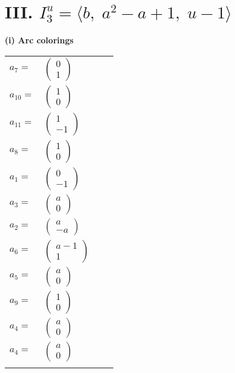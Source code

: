 \documentclass[1p]{elsarticle_modified}
\theoremstyle{definition}
\begin{document}
\centering \section*{III. $I^u_{3}= \langle b,\;a^2- a+1,\;u-1 \rangle$}
\flushleft \textbf{(i) Arc colorings}\\
\begin{tabular}{m{7pt} m{180pt} m{7pt} m{180pt} }
\flushright $a_{7}=$&$\begin{pmatrix}0\\1\end{pmatrix}$ \\
\flushright $a_{10}=$&$\begin{pmatrix}1\\0\end{pmatrix}$ \\
\flushright $a_{11}=$&$\begin{pmatrix}1\\-1\end{pmatrix}$ \\
\flushright $a_{8}=$&$\begin{pmatrix}1\\0\end{pmatrix}$ \\
\flushright $a_{1}=$&$\begin{pmatrix}0\\-1\end{pmatrix}$ \\
\flushright $a_{3}=$&$\begin{pmatrix}a\\0\end{pmatrix}$ \\
\flushright $a_{2}=$&$\begin{pmatrix}a\\- a\end{pmatrix}$ \\
\flushright $a_{6}=$&$\begin{pmatrix}a-1\\1\end{pmatrix}$ \\
\flushright $a_{5}=$&$\begin{pmatrix}a\\0\end{pmatrix}$ \\
\flushright $a_{9}=$&$\begin{pmatrix}1\\0\end{pmatrix}$ \\
\flushright $a_{4}=$&$\begin{pmatrix}a\\0\end{pmatrix}$\\ \flushright $a_{4}=$&$\begin{pmatrix}a\\0\end{pmatrix}$\\&\end{tabular}
\end{document}
